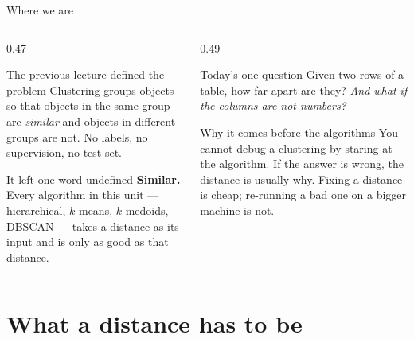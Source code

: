 \documentclass[aspectratio=169]{beamer}
\begin{document}
\begin{frame}[shrink=14]{Where we are}
  \begin{columns}[T]
    \begin{column}{0.47\textwidth}
      \begin{block}{The previous lecture defined the problem}
        Clustering groups objects so that objects in the same group are
        \emph{similar} and objects in different groups are not. No labels,
        no supervision, no test set.
      \end{block}
      \begin{block}{It left one word undefined}
        \textbf{Similar.} Every algorithm in this unit --- hierarchical,
        $k$-means, $k$-medoids, DBSCAN --- takes a distance as its input and
        is only as good as that distance.
      \end{block}
    \end{column}
    \begin{column}{0.49\textwidth}
      \begin{exampleblock}{Today's one question}
        Given two rows of a table, how far apart are they? \emph{And what if
        the columns are not numbers?}
      \end{exampleblock}
      \begin{alertblock}{Why it comes before the algorithms}
        You cannot debug a clustering by staring at the algorithm. If the
        answer is wrong, the distance is usually why. Fixing a distance is
        cheap; re-running a bad one on a bigger machine is not.
      \end{alertblock}
    \end{column}
  \end{columns}
\end{frame}

\section[Axioms]{What a distance has to be}
\label{sec:axioms}
\end{document}
